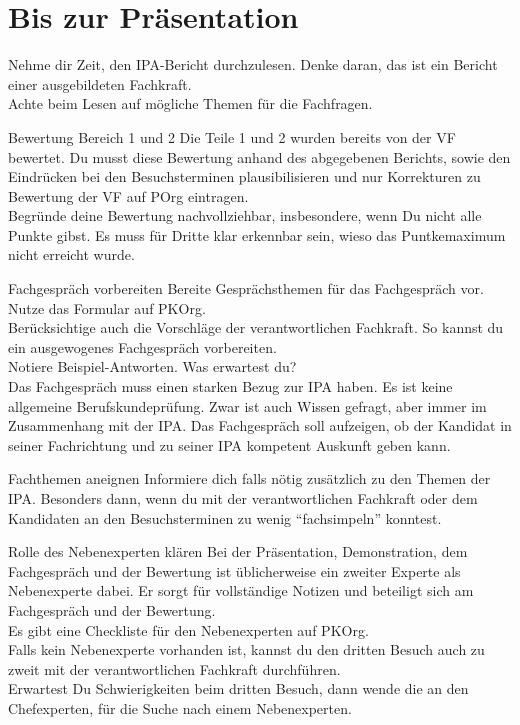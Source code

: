 \section{Bis zur Präsentation}
Nehme dir Zeit, den IPA-Bericht durchzulesen. Denke daran, das ist ein Bericht einer ausgebildeten Fachkraft.\\Achte beim Lesen auf mögliche Themen für die Fachfragen.

\begin{taskitemwithoutcomment}{Bewertung Bereich 1 und 2}
  Die Teile 1 und 2 wurden bereits von der VF bewertet. Du musst diese Bewertung anhand des abgegebenen Berichts, sowie den Eindrücken bei den Besuchsterminen plausibilisieren und nur Korrekturen zu Bewertung der VF auf POrg eintragen.\\Begründe deine Bewertung nachvollziehbar, insbesondere, wenn Du nicht alle Punkte gibst. Es muss für Dritte klar erkennbar sein, wieso das Puntkemaximum nicht erreicht wurde.
\end{taskitemwithoutcomment}
\begin{taskitemwithoutcomment}{Fachgespräch vorbereiten}
  Bereite Gesprächsthemen für das Fachgespräch vor.\\Nutze das Formular auf PKOrg.\\Berücksichtige auch die Vorschläge der verantwortlichen Fachkraft. So kannst du ein ausgewogenes Fachgespräch vorbereiten.\\Notiere Beispiel-Antworten. Was erwartest du?\\Das Fachgespräch muss einen starken Bezug zur IPA haben. Es ist keine allgemeine Berufskundeprüfung. Zwar ist auch Wissen gefragt, aber immer im Zusammenhang mit der IPA. Das Fachgespräch soll aufzeigen, ob der Kandidat in seiner Fachrichtung und zu seiner IPA kompetent Auskunft geben kann.
\end{taskitemwithoutcomment}
\begin{taskitem}{Fachthemen aneignen}
  Informiere dich falls nötig zusätzlich zu den Themen der IPA. Besonders dann, wenn du mit der verantwortlichen Fachkraft oder dem Kandidaten an den Besuchsterminen zu wenig \enquote{fachsimpeln} konntest.
\end{taskitem}
\begin{taskitemwithoutcomment}{Rolle des Nebenexperten klären}
  Bei der Präsentation, Demonstration, dem Fachgespräch und der Bewertung ist üblicherweise ein zweiter Experte als Nebenexperte dabei. Er sorgt für vollständige Notizen und beteiligt sich am Fachgespräch und der Bewertung.\\Es gibt eine Checkliste für den Nebenexperten auf PKOrg.\\Falls kein Nebenexperte vorhanden ist, kannst du den dritten Besuch auch zu zweit mit der verantwortlichen Fachkraft durchführen.\\Erwartest Du Schwierigkeiten beim dritten Besuch, dann wende die an den Chefexperten, für die Suche nach einem Nebenexperten.
\end{taskitemwithoutcomment}
